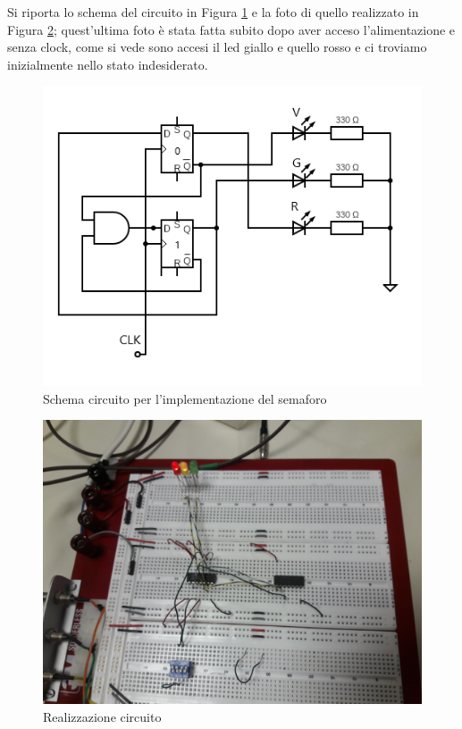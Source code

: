 \documentclass[10pt,a4paper]{article}
\begin{document}
Si riporta lo schema del circuito in Figura \ref{fig:circ} e la foto di quello realizzato in Figura \ref{fig:vg}; quest'ultima foto è stata fatta subito dopo aver acceso l'alimentazione e senza clock, come si vede sono accesi il led giallo e quello rosso e ci troviamo inizialmente nello stato indesiderato. 
\begin{figure}[h]

			\centering

			\includegraphics[scale=0.8]{circuit}

			\caption{ Schema circuito per l'implementazione del semaforo}

			\label{fig:circ}

\end{figure}

\begin{figure}[h]

			\centering

			\includegraphics[scale=0.07]{gr}

			\caption{ Realizzazione circuito}

			\label{fig:vg}

\end{figure}
\end{document}
